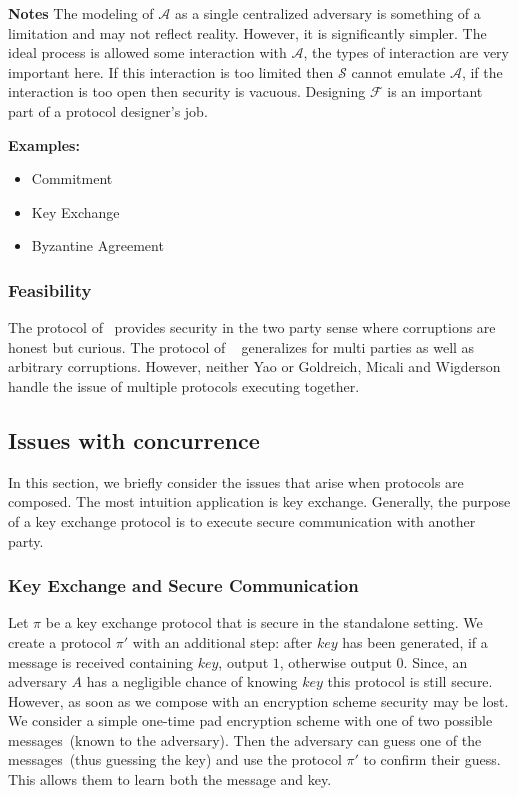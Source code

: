 \documentclass{article}
\begin{document}
\textbf{Notes} The modeling of $\mathcal{A}$ as a single centralized adversary is something of a limitation and may not reflect reality.  However, it is significantly simpler.  The ideal process is allowed some interaction with $\mathcal{A}$, the types of interaction are very important here.  If this interaction is too limited then $\mathcal{S}$ cannot emulate $\mathcal{A}$, if the interaction is too open then security is vacuous.  Designing $\mathcal{F}$ is an important part of a protocol designer's job.

\textbf{Examples:}
\begin{itemize}
\item Commitment
\item Key Exchange
\item Byzantine Agreement
\end{itemize}
\subsubsection{Feasibility}
The protocol of~\cite{yao1986} provides security in the two party sense where corruptions are honest but curious.  The protocol of ~\cite{GoldreichMW87} generalizes for multi parties as well as arbitrary corruptions.  However, neither Yao or Goldreich, Micali and Wigderson handle the issue of multiple protocols executing together.
\subsection{Issues with concurrence}
In this section, we briefly consider the issues that arise when protocols are composed.  The most intuition application is key exchange.  Generally, the purpose of a key exchange protocol is to execute secure communication with another party.
\subsubsection{Key Exchange and Secure Communication}
Let $\pi$ be a key exchange protocol that is secure in the standalone setting.  We create a protocol $\pi'$ with an additional step: after $key$ has been generated, if a message is received containing $key$, output $1$, otherwise output $0$.  Since, an adversary $A$ has a negligible chance of knowing $key$ this protocol is still secure.  However, as soon as we compose with an encryption scheme security may be lost.  We consider a simple one-time pad encryption scheme with one of two possible messages~(known to the adversary).  Then the adversary can guess one of the messages~(thus guessing the key) and use the protocol $\pi'$ to confirm their guess.  This allows them to learn both the message and key.
\end{document}
